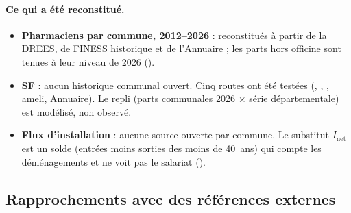 \paragraph{Ce qui a été reconstitué.}
\begin{itemize}
  \item \textbf{Pharmaciens par commune, 2012--2026} : reconstitués à partir de la DREES, de FINESS historique
  et de l'Annuaire ; les parts hors officine sont tenues à leur niveau de 2026\suppose{} ().
  \item \textbf{SF} : aucun historique communal ouvert. Cinq routes ont été testées (,
  , , ameli, Annuaire). Le repli (parts communales 2026
  $\times$ série départementale) est modélisé, non observé.
  \item \textbf{Flux d'installation} : aucune source ouverte par commune. Le substitut $I_{\mathrm{net}}$ est un
  solde (entrées moins sorties des moins de 40~ans) qui compte les déménagements et ne voit pas le salariat
  ().
\end{itemize}

\subsection{Rapprochements avec des références externes}\label{don:rapprochements}

